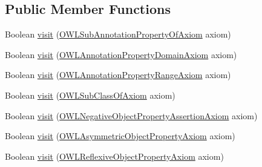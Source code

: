 \subsection*{Public Member Functions}
\begin{DoxyCompactItemize}
\item 
Boolean \hyperlink{classorg_1_1semanticweb_1_1owlapi_1_1util_1_1_horn_axiom_visitor_ex_a313f8ad37b37752d993a727622c5d3d4}{visit} (\hyperlink{interfaceorg_1_1semanticweb_1_1owlapi_1_1model_1_1_o_w_l_sub_annotation_property_of_axiom}{O\-W\-L\-Sub\-Annotation\-Property\-Of\-Axiom} axiom)
\item 
Boolean \hyperlink{classorg_1_1semanticweb_1_1owlapi_1_1util_1_1_horn_axiom_visitor_ex_a49cd6103be9e07a445518abc982aac2b}{visit} (\hyperlink{interfaceorg_1_1semanticweb_1_1owlapi_1_1model_1_1_o_w_l_annotation_property_domain_axiom}{O\-W\-L\-Annotation\-Property\-Domain\-Axiom} axiom)
\item 
Boolean \hyperlink{classorg_1_1semanticweb_1_1owlapi_1_1util_1_1_horn_axiom_visitor_ex_a68fefb460eed1934c60cc958e132750a}{visit} (\hyperlink{interfaceorg_1_1semanticweb_1_1owlapi_1_1model_1_1_o_w_l_annotation_property_range_axiom}{O\-W\-L\-Annotation\-Property\-Range\-Axiom} axiom)
\item 
Boolean \hyperlink{classorg_1_1semanticweb_1_1owlapi_1_1util_1_1_horn_axiom_visitor_ex_a40c7c5715b5b8f4394107c76d967c4ea}{visit} (\hyperlink{interfaceorg_1_1semanticweb_1_1owlapi_1_1model_1_1_o_w_l_sub_class_of_axiom}{O\-W\-L\-Sub\-Class\-Of\-Axiom} axiom)
\item 
Boolean \hyperlink{classorg_1_1semanticweb_1_1owlapi_1_1util_1_1_horn_axiom_visitor_ex_ae8aa47f4c149dbd513728912c3fbb6cf}{visit} (\hyperlink{interfaceorg_1_1semanticweb_1_1owlapi_1_1model_1_1_o_w_l_negative_object_property_assertion_axiom}{O\-W\-L\-Negative\-Object\-Property\-Assertion\-Axiom} axiom)
\item 
Boolean \hyperlink{classorg_1_1semanticweb_1_1owlapi_1_1util_1_1_horn_axiom_visitor_ex_af1093f65f21e7ba4dd1f10687041bafb}{visit} (\hyperlink{interfaceorg_1_1semanticweb_1_1owlapi_1_1model_1_1_o_w_l_asymmetric_object_property_axiom}{O\-W\-L\-Asymmetric\-Object\-Property\-Axiom} axiom)
\item 
Boolean \hyperlink{classorg_1_1semanticweb_1_1owlapi_1_1util_1_1_horn_axiom_visitor_ex_a1764f3e1f120497084d265fc535fbe01}{visit} (\hyperlink{interfaceorg_1_1semanticweb_1_1owlapi_1_1model_1_1_o_w_l_reflexive_object_property_axiom}{O\-W\-L\-Reflexive\-Object\-Property\-Axiom} axiom)
\item 

\end{DoxyCompactItemize}

